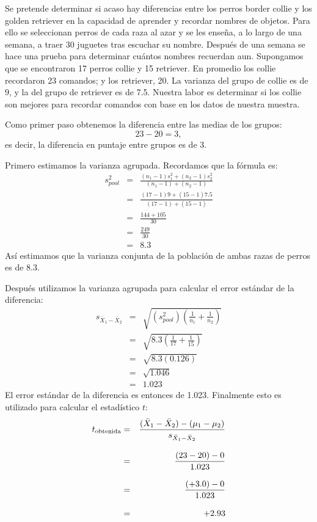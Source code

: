 \documentclass[a4paper,12pt]{article}
\begin{document}
Se pretende determinar si acaso hay diferencias entre los perros border collie y los golden retriever en la capacidad de aprender y recordar nombres de objetos. Para ello se seleccionan perros de cada raza al azar y se les enseña, a lo largo de una semana, a traer 30 juguetes tras escuchar su nombre. Después de una semana se hace una prueba para determinar cuántos nombres recuerdan aun. Supongamos que se encontraron 17 perros collie y 15 retriever. En promedio los collie recordaron 23 comandos; y los retriever, 20. La varianza del grupo de collie es de 9, y la del grupo de retriever es de 7.5. Nuestra labor es determinar si los collie son mejores para recordar comandos con base en los datos de nuestra muestra.

Como primer paso obtenemos la diferencia entre las medias de los grupos:
\[
  23 - 20 = 3
,\]
es decir, la diferencia en puntaje entre grupos es de 3.

Primero estimamos la varianza agrupada. Recordamos que la fórmula es:
\begin{eqnarray*}
  s_{pool}^{2}&=&\frac{
    (n_{1} - 1)s_{1}^{2} + (n_{2} - 1)s_{2}^{2}
  }{
    (n_{1} - 1) + (n_{2} - 1)
  }\\[3mm]
  &=& \frac{
    (17 - 1) 9 + (15 - 1) 7{.}5
  }{
    (17 - 1) + (15 - 1)
  }\\[3mm]
  &=& \frac{
    144 + 105
  }{
    30
  }\\[3mm]
  &=& \frac{
    249
  }{
    30
  }\\[3mm]
  &=& 8{.}3
\end{eqnarray*}
Así estimamos que la varianza conjunta de la población de ambas razas de perros es de 8.3.

Después utilizamos la varianza agrupada para calcular el error estándar de la diferencia:
\begin{eqnarray*}
  s_{\bar{X}_{1} - \bar{X}_{2}}&=&\sqrt{
  \left(s_{pool}^{2}\right)\left(\frac{1}{n_{1}} + \frac{1}{n_{2}}\right)}\\[3mm]
  &=& \sqrt{
    8{.}3\left(\frac{1}{17} + \frac{1}{15}\right)
  }\\[3mm]
  &=& \sqrt{8{.}3(0{.}126)}\\[3mm]
  &=& \sqrt{1{.}046}\\
  &=& 1{.}023
\end{eqnarray*}
El error estándar de la diferencia es entonces de 1.023. Finalmente esto es utilizado para calcular el estadístico $t$:
\begin{eqnarray*}
  t_{\mbox{\scriptsize obtenida}}&=&\frac{
    (\bar{X}_{1} - \bar{X}_{2}) - (\mu_{1} - \mu_{2})
  }{
    s_{\bar{X}_{1} - \bar{X}_{2}}
  }\\[3mm]
  &=&\frac{
    (23 - 20) - 0
  }{
    1{.}023
  }\\[3mm]
  &=&\frac{
    (+3{.}0) - 0
  }{
    1{.}023
  }\\[3mm]
  &=&+2{.}93
\end{eqnarray*}
\end{document}
